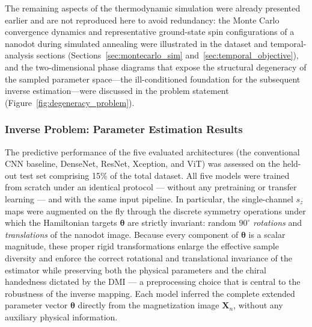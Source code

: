 \documentclass[letterpaper, 12, one column]{article}
\begin{document}
The remaining aspects of the thermodynamic simulation were already presented earlier and are not reproduced here to avoid redundancy: the Monte Carlo convergence dynamics and representative ground-state spin configurations of a nanodot during simulated annealing were illustrated in the dataset and temporal-analysis sections (Sections~\ref{sec:montecarlo_sim} and~\ref{sec:temporal_objective}), and the two-dimensional phase diagrams that expose the structural degeneracy of the sampled parameter space---the ill-conditioned foundation for the subsequent inverse estimation---were discussed in the problem statement (Figure~\ref{fig:degeneracy_problem}).

\subsubsection{Inverse Problem: Parameter Estimation Results}\label{sec:dl_results}

The predictive performance of the five evaluated architectures (the
conventional CNN baseline, DenseNet, ResNet, Xception, and ViT) was
assessed on the held-out test set comprising 15\% of the total dataset.
All five models were trained from scratch under an identical protocol
--- without any pretraining or transfer learning --- and with the same
input pipeline. In particular, the single-channel $s_z$ maps were
augmented on the fly through the discrete symmetry operations under
which the Hamiltonian targets $\boldsymbol{\theta}$ are strictly
invariant: random $90^\circ$ \emph{rotations} and \emph{translations}
of the nanodot image. Because every component of $\boldsymbol{\theta}$
is a scalar magnitude, these proper rigid transformations enlarge the
effective sample diversity and enforce the correct rotational and
translational invariance of the estimator while preserving both the
physical parameters and the chiral handedness dictated by the DMI ---
a preprocessing choice that is central to the robustness of the
inverse mapping. Each model inferred the complete extended parameter
vector $\boldsymbol{\theta}$ directly from the magnetization image
$\mathbf{X}_n$, without any auxiliary physical information.
\end{document}
